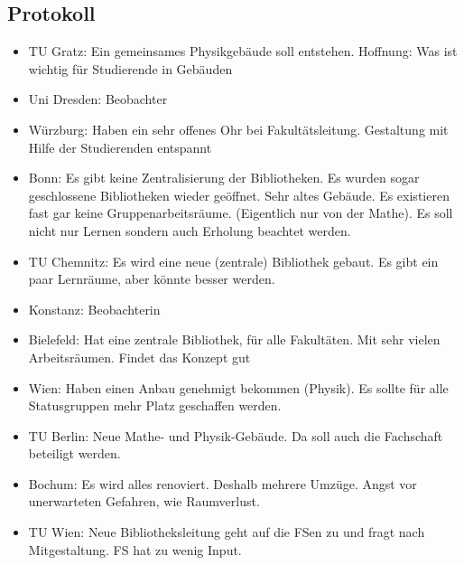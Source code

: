  \subsection*{Protokoll}
      \begin{itemize}
        \item TU Gratz: Ein gemeinsames Physikgebäude soll entstehen. Hoffnung: Was ist wichtig für Studierende in Gebäuden

        \item Uni Dresden: Beobachter

        \item Würzburg: Haben ein sehr offenes Ohr bei Fakultätsleitung. Gestaltung mit Hilfe der Studierenden entspannt

        \item Bonn: Es gibt keine Zentralisierung der Bibliotheken. Es wurden sogar geschlossene Bibliotheken wieder geöffnet. Sehr altes Gebäude.
        Es existieren fast gar keine Gruppenarbeitsräume. (Eigentlich nur von der Mathe). Es soll nicht nur Lernen sondern auch Erholung beachtet werden.

        \item TU Chemnitz: Es wird eine neue (zentrale) Bibliothek gebaut. Es gibt ein paar Lernräume, aber könnte besser werden.

        \item Konstanz: Beobachterin

        \item Bielefeld: Hat eine zentrale Bibliothek, für alle Fakultäten. Mit sehr vielen Arbeitsräumen. Findet das Konzept gut

        \item Wien: Haben einen Anbau genehmigt bekommen (Physik). Es sollte für alle Statusgruppen mehr Platz geschaffen werden.

        \item TU Berlin: Neue Mathe- und Physik-Gebäude. Da soll auch die Fachschaft beteiligt werden.

        \item Bochum: Es wird alles renoviert. Deshalb mehrere Umzüge. Angst vor unerwarteten Gefahren, wie Raumverlust.

        \item TU Wien: Neue Bibliotheksleitung geht auf die FSen zu und fragt nach Mitgestaltung. FS hat zu wenig Input.
      \end{itemize}

